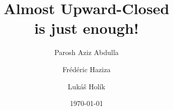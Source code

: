 

\title{Almost Upward-Closed\\is just enough!}

\author{%
  Parosh Aziz Abdulla  \and
  Fr\'ed\'eric Haziza  \and
  Luk\'a\v s Hol\'ik  %
} 


\date{\today}

\maketitle
